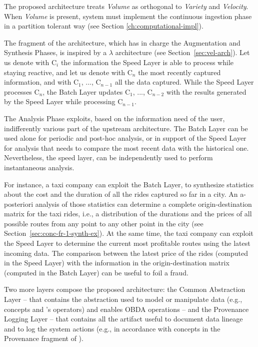 The proposed architecture treats \textit{Volume} as orthogonal to \textit{Variety} and \textit{Velocity}. When \textit{Volume} is present, system must implement the continuous ingestion phase in a partition tolerant way (see Section \ref{ch:computational-impl}). 

The fragment of the architecture, which has in charge the Augmentation and Synthesis Phases, is inspired by a $\lambda$ architecture (see Section~\ref{sec:vel-arch}). 
Let us denote with C$_i$ the information the Speed Layer is able to process while staying reactive, and let us denote with C$_n$ the most recently captured information, and with C$_1$, ..., C$_{n-1}$ all the data captured. While the Speed Layer processes C$_n$, the Batch Layer updates C$_1$, ..., C$_{n-2}$ with the results generated by the Speed Layer while processing C$_{n-1}$.

The Analysis Phase exploits, based on the information need of the user, indifferently various part of the upstream architecture. The Batch Layer can be used alone for periodic and post-hoc analysis, or in support of the Speed Layer for analysis that needs to compare the most recent data with the historical one. Nevertheless, the speed layer, can be independently used to perform instantaneous analysis.

For instance, a taxi company can exploit the Batch Layer, to synthesize statistics about the cost and the duration of all the rides captured so far in a city. An a-posteriori analysis of those statistics can determine a complete origin-destination matrix for the taxi rides, i.e., a distribution of the durations and the prices of all possible routes from any point to any other point in the city (see Section~\ref{sec:conc-fr-1-synth-ex}). At the same time, the taxi company can exploit the Speed Layer to determine the current most profitable routes using the latest incoming data. The comparison between the latest price of the rides (computed in the Speed Layer) with the information in the origin-destination matrix (computed in the Batch Layer) can be useful to foil a fraud.  

Two more layers compose the proposed architecture: the Common Abstraction Layer -- that contains the abstraction used to model or manipulate data (e.g., \frappe{} concepts and \river{}'s operators) and enables OBDA operations -- and the Provenance Logging Layer -- that contains all the artifact useful to document data lineage and to log the system actions (e.g., in accordance with concepts in the Provenance fragment of \frappe{}).

